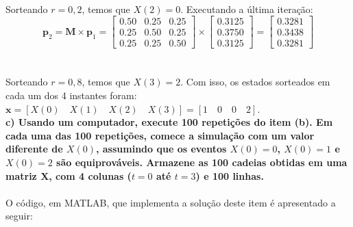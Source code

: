\documentclass{report}
\begin{document}
\paragraph{} Sorteando $r = 0,2$, temos que $X(2) = 0$. Executando a última iteração:\\

\begin{equation*}
\mathbf{p}_2 = \mathbf{M} \times \mathbf{p}_1 = \left[ \begin{array}{ccc}
0.50 & 0.25 & 0.25 \\ 
0.25 & 0.50 & 0.25 \\ 
0.25 & 0.25 & 0.50 
\end{array} \right] \times \left[\begin{array}{c}
0.3125 \\ 
0.3750 \\ 
0.3125
\end{array} \right] = \left[ \begin{array}{c}
0.3281 \\ 
0.3438 \\ 
0.3281
\end{array}  \right]
\end{equation*}\\

\paragraph{} Sorteando $r = 0,8$, temos que $X(3) = 2$. Com isso, os estados sorteados em cada um dos 4 instantes foram: $\mathbf{x} = [X(0) \quad X(1) \quad X(2) \quad X(3)] = [1 \quad 0 \quad 0 \quad 2]$.\\ 

\textbf{c) Usando um computador, execute 100 repetições do item (b). Em cada uma das 100 repetições, comece a simulação com um valor diferente de $X(0)$, assumindo que os eventos $X(0) = 0$, $X(0) = 1$ e $X(0) = 2$ são equiprováveis. Armazene as 100 cadeias obtidas em uma matriz $\mathbf{X}$, com 4 colunas ($t = 0$ até $t = 3$) e 100 linhas.}\\

\paragraph{} O código, em MATLAB, que implementa a solução deste item é apresentado a seguir:\\
\end{document}
